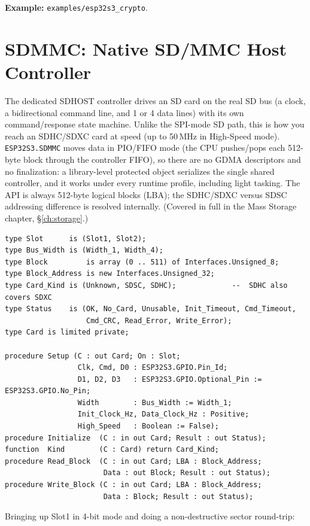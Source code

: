 \noindent\textbf{Example:} \texttt{examples/esp32s3\_crypto}.

\section{SDMMC: Native SD/MMC Host Controller}
\label{app:int:sdmmc}

The dedicated SDHOST controller drives an SD card on the real SD bus (a clock,
a bidirectional command line, and 1 or 4 data lines) with its own
command/response state machine. Unlike the SPI-mode SD path, this is how you reach
an SDHC/SDXC card at speed (up to 50\,MHz in High-Speed mode).
\texttt{ESP32S3.SDMMC} moves data in PIO/FIFO mode (the CPU pushes/pops each
512-byte block through the controller FIFO), so there are no GDMA descriptors and
no finalization: a library-level protected object serializes the single shared
controller, and it works under every runtime profile, including light tasking. The
API is always 512-byte logical blocks (LBA); the SDHC/SDXC versus SDSC addressing
difference is resolved internally. (Covered in full in the Mass Storage chapter,
\S\ref{ch:storage}.)

\begin{lstlisting}
type Slot      is (Slot1, Slot2);
type Bus_Width is (Width_1, Width_4);
type Block         is array (0 .. 511) of Interfaces.Unsigned_8;
type Block_Address is new Interfaces.Unsigned_32;
type Card_Kind is (Unknown, SDSC, SDHC);             --  SDHC also covers SDXC
type Status    is (OK, No_Card, Unusable, Init_Timeout, Cmd_Timeout,
                   Cmd_CRC, Read_Error, Write_Error);
type Card is limited private;

procedure Setup (C : out Card; On : Slot;
                 Clk, Cmd, D0 : ESP32S3.GPIO.Pin_Id;
                 D1, D2, D3   : ESP32S3.GPIO.Optional_Pin := ESP32S3.GPIO.No_Pin;
                 Width        : Bus_Width := Width_1;
                 Init_Clock_Hz, Data_Clock_Hz : Positive;
                 High_Speed   : Boolean := False);
procedure Initialize  (C : in out Card; Result : out Status);
function  Kind        (C : Card) return Card_Kind;
procedure Read_Block  (C : in out Card; LBA : Block_Address;
                       Data : out Block; Result : out Status);
procedure Write_Block (C : in out Card; LBA : Block_Address;
                       Data : Block; Result : out Status);
\end{lstlisting}

Bringing up Slot1 in 4-bit mode and doing a non-destructive sector round-trip:

